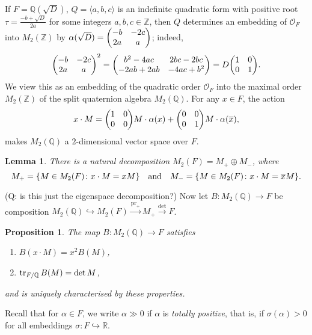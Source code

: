 \documentclass[11pt,a4paper]{article}
\newcommand{\Z}{\mathbb{Z}}
\newcommand{\Q}{\mathbb{Q}}
\newcommand{\R}{\mathbb{R}}
\renewcommand{\O}{\mathscr{O}}
\renewcommand{\bar}{\overline}
\DeclareMathOperator{\pr}{pr}
\theoremstyle{plain}
\newtheorem{lemma}[thm]{Lemma}
\newtheorem{prop}[thm]{Proposition}
\theoremstyle{definition}
\theoremstyle{remark}
\numberwithin{equation}{section}
\begin{document}
If $F = \Q(\sqrt{D})$, $Q = \langle a,b,c \rangle$ is an indefinite quadratic form with
positive root $\tau = \frac{-b+\sqrt{D}}{2a}$ for some
integers $a,b,c \in \Z$, then $Q$ determines an embedding of $\O_{F}$ into
$M_{2}(\Z)$ by $\alpha(\sqrt{D}) = \mqty(-b & -2c \\ 2a & a)$; indeed,
\[ \mqty(-b & -2c \\ 2a & a)^{2} = \mqty(b^{2}-4ac & 2bc - 2bc \\ -2ab
  + 2ab & -4ac + b^{2}) = D\mqty(1 & 0 \\ 0 & 1).
\]
We view this as an embedding of the quadratic order $\O_{F}$ into the
maximal order $M_{2}(\Z)$ of the split quaternion algebra
$M_{2}(\Q)$. For any $x \in F$, the action
\begin{equation}
  \label{eq:11}
  x \cdot M = \mqty(1 & 0 \\ 0 & 0) M\cdot \alpha(x) + \mqty(0 & 0 \\ 0 & 1) M\cdot
  \alpha(\bar x),
\end{equation}
makes $M_{2}(\Q)$ a $2$-dimensional vector space over $F$. 
\begin{lemma}
  There is a natural decomposition  $M_{2}(F) = M_{+}\oplus M_{-}$, where
  \begin{equation*}
    M_{+} = \{M \in M_{2}(F) \colon x \cdot M = xM \} \qq{and}     M_{-} =
    \{M \in M_{2}(F) \colon x \cdot M = \bar x M \}.
  \end{equation*}
\end{lemma}
(Q: is this just the eigenspace decomposition?)
Now let $B\colon M_{2}(\Q) \to F$ be composition $M_{2}(\Q) \hookrightarrow M_{2}(F)
\xrightarrow{\pr_{+}} M_{+} \xrightarrow{\det} F$. 
\begin{prop}
  The map $B\colon M_{2}(\Q) \to F$ satisfies
  \begin{enumerate}
  \item $B(x\cdot M) = x^{2}B(M)$,
  \item $\tr_{F/\Q}B(M) = \det M$,
  \end{enumerate}
  and is uniquely characterised by these properties.
\end{prop}
Recall that for $\alpha \in F$, we write $\alpha \gg 0$ if $\alpha$ is \emph{totally
  positive}, that is, if $\sigma(\alpha)>0$ for all embeddings $\sigma \colon F \hookrightarrow \R$.
\end{document}
